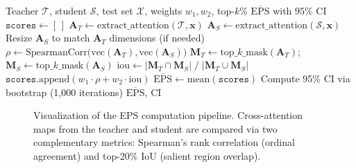 \documentclass[lettersize,journal]{IEEEtran}
\begin{document}
\begin{algorithm}[!t]
\caption{Explainability Preservation Score Computation}
\label{alg:eps}
\begin{algorithmic}[1]
\REQUIRE Teacher $\mathcal{T}$, student $\mathcal{S}$, test set $\mathcal{X}$, weights $w_1, w_2$, top-$k$\%
\ENSURE $\overline{\text{EPS}}$ with 95\% CI
\STATE $\texttt{scores} \leftarrow [\,]$
    \STATE $\mathbf{A}_T \leftarrow \text{extract\_attention}(\mathcal{T}, \mathbf{x})$
    \STATE $\mathbf{A}_S \leftarrow \text{extract\_attention}(\mathcal{S}, \mathbf{x})$
    \STATE Resize $\mathbf{A}_S$ to match $\mathbf{A}_T$ dimensions (if needed)
    \STATE $\rho \leftarrow \text{SpearmanCorr}\bigl(\text{vec}(\mathbf{A}_T), \text{vec}(\mathbf{A}_S)\bigr)$
    \STATE $\mathbf{M}_T \leftarrow \text{top\_}k\text{\_mask}(\mathbf{A}_T)$; $\mathbf{M}_S \leftarrow \text{top\_}k\text{\_mask}(\mathbf{A}_S)$
    \STATE $\text{iou} \leftarrow |\mathbf{M}_T \cap \mathbf{M}_S| \;/\; |\mathbf{M}_T \cup \mathbf{M}_S|$
    \STATE $\texttt{scores}.\text{append}(w_1 \cdot \rho + w_2 \cdot \text{iou})$
\ENDFOR
\STATE $\overline{\text{EPS}} \leftarrow \text{mean}(\texttt{scores})$
\STATE Compute 95\% CI via bootstrap (1{,}000 iterations)
\RETURN $\overline{\text{EPS}}$, CI
\end{algorithmic}
\end{algorithm}

\begin{figure}[!t]
\centering
{}
\caption{Visualization of the EPS computation pipeline. Cross-attention maps from the teacher and student are compared via two complementary metrics: Spearman's rank correlation (ordinal agreement) and top-20\% IoU (salient region overlap).}
\label{fig:eps}
\end{figure}
\end{document}
